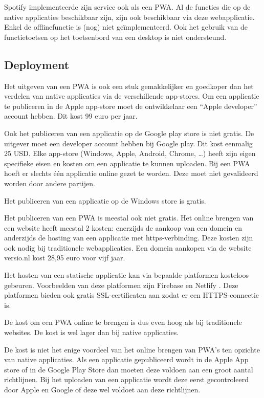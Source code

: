 	Spotify implementeerde zijn service ook als een PWA. \autocite{Spotify2020} Al de functies die op de native applicaties beschikbaar zijn, zijn ook beschikbaar via deze webapplicatie. Enkel de offlinefunctie is (nog) niet geïmplementeerd. Ook het gebruik van de functietoetsen op het toetsenbord van een desktop is niet ondersteund.
	\autocite{Vu2019}
	
	
\subsection{Deployment}

	Het uitgeven van een PWA is ook een stuk gemakkelijker en goedkoper dan het verdelen van native applicaties via de verschillende app-stores. 
	Om een applicatie te publiceren in de Apple app-store moet de ontwikkelaar een “Apple developer” account hebben. Dit kost 99 euro per jaar. 
	\autocite{Apple2020b}
	
	Ook het publiceren van een applicatie op de Google play store is niet gratis. De uitgever moet een developer account hebben bij Google play. Dit kost eenmalig 25 USD.
	Elke app-store (Windows, Apple, Android, Chrome, …) heeft zijn eigen specifieke eisen en kosten om een applicatie te kunnen uploaden. Bij een PWA hoeft er slechts één applicatie online gezet te worden. Deze moet niet gevalideerd worden door andere partijen. 
	\autocite{GooglePlay2020}
	
	Het publiceren van een applicatie op de Windows store is gratis.
	
	Het publiceren van een PWA is meestal ook niet gratis. Het online brengen van een website heeft meestal 2 kosten: enerzijds de aankoop van een domein en anderzijds de hosting van een applicatie met https-verbinding. Deze kosten zijn ook nodig bij traditionele webapplicaties.
	Een domein aankopen via de website versio.nl kost 28,95 euro voor vijf jaar.
	\autocite{Versio2020}
	
	Het hosten van een statische applicatie kan via bepaalde platformen kosteloos gebeuren. Voorbeelden van deze platformen zijn Firebase \autocite{Firebase2020} en Netlify \autocite{Netflify2020}. 	
	Deze platformen bieden ook gratis SSL-certificaten aan zodat er een HTTPS-connectie is. 
	
	De kost om een PWA online te brengen is dus even hoog als bij traditionele websites. De kost is wel lager dan bij native applicaties. 	
	
	De kost is niet het enige voordeel van het online brengen van PWA's ten opzichte van native applicaties. Als een applicatie gepubliceerd wordt in de Apple App store of in de Google Play Store dan moeten deze voldoen aan een groot aantal richtlijnen. Bij het uploaden van een applicatie wordt deze eerst gecontroleerd door Apple en Google of deze wel voldoet aan deze richtlijnen. 
	\autocite{Apple2020c}
	\autocite{GooglePlay2020a}
	
